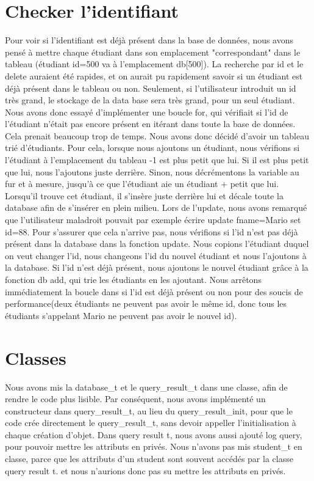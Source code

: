 \documentclass[utf8]{article}
\begin{document}
\section{Checker l'identifiant}
\indent{}
\par
Pour voir si l'identifiant est déjà présent dans la base de données, nous avons pensé à mettre chaque étudiant
dans son emplacement "correspondant" dans le tableau (étudiant id=500 va à l'emplacement db[500]). La recherche par id et le delete auraient été rapides, et on 
aurait pu rapidement savoir si un étudiant est déjà présent dans le tableau ou non.
Seulement, si l'utilisateur introduit un id très grand, le stockage de la data base sera très grand, pour un seul étudiant.
Nous avons donc essayé d'implémenter une boucle for, qui vérifiait si l'id de l'étudiant n'était pas encore présent en itérant dans toute la base de données.
Cela prenait beaucoup trop de temps. Nous avons donc décidé d'avoir un tableau trié d'étudiants. Pour cela, lorsque nous ajoutons un étudiant,
nous vérifions si l'étudiant à l'emplacement du tableau -1 est plus petit que lui. Si il est plus petit que lui, nous l'ajoutons juste derrière. Sinon, 
nous décrémentons la variable au fur et à mesure, jusqu'à ce que l'étudiant aie un étudiant + petit que lui. Lorsqu'il trouve cet étudiant, il s'insère juste derrière lui
et décale toute la database afin de s'insérer en plein milieu.
Lors de l'update, nous avons remarqué que l'utilisateur maladroit pouvait par exemple écrire update fname=Mario set id=88.
Pour s'assurer que cela n'arrive pas, nous vérifions si l'id n'est pas déjà présent dans la database dans la fonction update.
Nous copions l'étudiant duquel on veut changer l'id, nous changeons l'id du nouvel étudiant et nous l'ajoutons à la database. Si l'id 
n'est déjà présent, nous ajoutons le nouvel étudiant grâce à la fonction db add, qui trie les étudiants en les ajoutant.
Nous arrêtons immédiatement la boucle dans si l'id est déjà présent ou non pour des soucis de performance(deux étudiants ne peuvent pas avoir le même id, 
donc tous les étudiants s'appelant Mario ne peuvent pas avoir le nouvel id). 
\par



\section{Classes}
\indent{}
\par
Nous avons mis la database\_t et le query\_result\_t dans une classe, afin de rendre le code plus lisible. Par conséquent,
nous avons implémenté un constructeur dans query\_result\_t, au lieu du query\_result\_init, pour que le code
crée directement le query\_result\_t, sans devoir appeller l'initialisation à chaque création d'objet.
Dans query result t, nous avons aussi ajouté log query, pour pouvoir mettre les attributs en privés.
Nous n'avons pas mis student\_t en classe, parce que les attributs d'un student sont souvent accédés par la classe query result t.
et nous n'aurions donc pas su mettre les attributs en privés.
\end{document}

